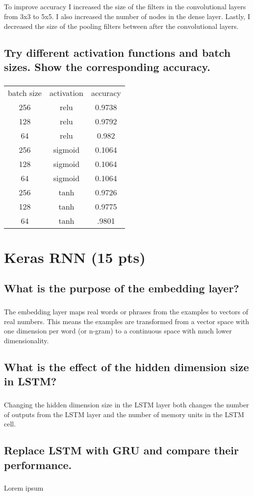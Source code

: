 \documentclass[11pt]{article}
\begin{document}
\subparagraph{}

To improve accuracy I increased the size of the filters in the convolutional layers from 3x3 to 5x5. I also increased the number of nodes in the dense layer. Lastly, I decreased the size of the pooling filters between after the convolutional layers.

\subsection{Try different activation functions and batch sizes. Show the corresponding accuracy.}

\subparagraph{}

\begin{center}
\begin{tabular}{ |c|c|c| }
	\hline
	batch size & activation & accuracy \\
	256 & relu & 0.9738 \\
	128 & relu & 0.9792 \\
	64 & relu & 0.982 \\
	\hline
	256 & sigmoid & 0.1064 \\
	128 & sigmoid & 0.1064 \\
	64 & sigmoid & 0.1064 \\
	\hline
	256 & tanh & 0.9726 \\
	128 & tanh & 0.9775 \\
	64 & tanh & .9801 \\
	\hline
\end{tabular}
\end{center}

\section{Keras RNN (15 pts)}

\subsection{What is the purpose of the embedding layer?}

\subparagraph{}

The embedding layer maps real words or phrases from the examples to vectors of real numbers. This means the examples are transformed from a vector space with one dimension per word (or n-gram) to a continuous space with much lower dimensionality.

\subsection{What is the effect of the hidden dimension size in LSTM?}

\subparagraph{}

Changing the hidden dimension size in the LSTM layer both changes the number of outputs from the LSTM layer and the number of memory units in the LSTM cell.

\subsection{Replace LSTM with GRU and compare their performance.}

\subparagraph{}

Lorem ipsum
\end{document}
